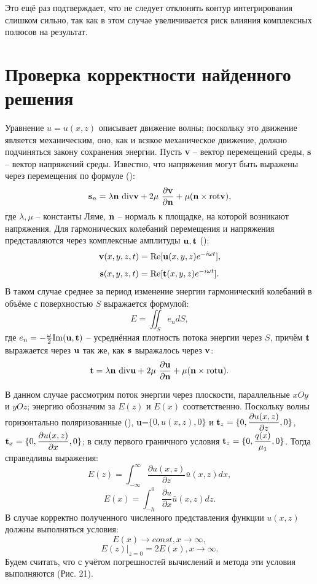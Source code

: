 \documentclass[a4paper, 12pt]{article}
\begin{document}
Это ещё раз подтверждает, что не следует отклонять контур интегрирования слишком сильно, так как в этом случае увеличивается риск влияния комплексных полюсов на результат.

\section{Проверка корректности найденного решения}
Уравнение $u=u(x,z)$ описывает движение волны; поскольку это движение является механическим, оно, как и всякое механическое движение, должно подчиняться закону сохранения энергии.
Пусть {\bf v} -- вектор перемещений среды, {\bf s} -- вектор напряжений среды. Известно, что напряжения могут быть выражены через перемещения по формуле (\cite{g89}):
$${\bf s}_n = \lambda {\bf n}\ \mathrm{div} {\bf v}+ 2\mu\ \dfrac{\partial {\bf v}}{\partial {\bf n}}+\mu ({\bf n} \times \mathrm{rot} {\bf v}),$$
где $\lambda, \mu$ -- константы Ляме, ${\bf n}$ -- нормаль к площадке, на которой возникают напряжения.
Для гармонических колебаний перемещения и напряжения представляются через комплексные амплитуды ${\bf u,\bf t}$ (\cite{g89}):
$${\bf v}(x,y,z,t)=\mathrm{Re} [{\bf u}(x,y,z) e^{-i\omega t}],$$
$${\bf s}(x,y,z,t)=\mathrm{Re} [{\bf t}(x,y,z) e^{-i\omega t}].$$
В таком случае среднее за период изменение энергии гармонический колебаний в объёме с поверхностью $S$ выражается формулой:
$$E=\iint_S e_n dS,$$
где $e_n=-\frac{\omega}{2}\mathrm{Im}({\bf u},{\bf t})$ -- усреднённая плотность потока энергии через $S$, причём $\bf t$ выражается через $\bf u$ так же, как $\bf s$ выражалось через $\bf v$:
$${\bf t} = \lambda {\bf n}\ \mathrm{div} {\bf u}+ 2\mu\ \dfrac{\partial {\bf u}}{\partial {\bf n}}+\mu ({\bf n} \times \mathrm{rot} {\bf u}).$$

В данном случае рассмотрим поток энергии через плоскости, параллельные $x O y$ и $y O z$; энергию обозначим за $E(z)$ и $E(x)$ соответственно. Поскольку волны горизонтально поляризованные (\cite{g89}), {\bf u}=$\{0,u(x,z),0 \}$ и ${\bf t}_z=\{0,\dfrac{\partial u(x,z)}{\partial z},0 \}$, ${\bf t}_x=\{0,\dfrac{\partial u(x,z)}{\partial x},0 \}$;
в силу первого граничного условия ${\bf t}_z=\{0,\dfrac{q(x)}{\mu_1},0 \}$. Тогда справедливы выражения:
$$E(z)=\int^{\infty}_{-\infty} \dfrac{\partial u(x,z)}{\partial z}  \bar u(x,z) dx,$$
$$E(x)=\int^0_{-h} \dfrac{\partial u}{\partial x}\bar u(x,z) dz.$$ 
В случае корректно полученного численного представления функции $u(x,z)$ должны выполняться условия:
$$E(x) \rightarrow c o n s t, x \rightarrow \infty ,$$
$$E(z)|_{z=0}=2E(x), x \rightarrow \infty .$$
Будем считать, что с учётом погрешностей вычислений и метода эти условия выполняются (Рис. 21).
\end{document}
